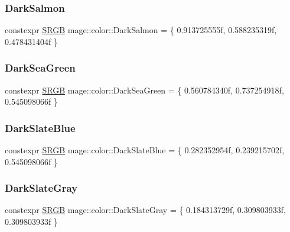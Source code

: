 \subsubsection{\texorpdfstring{Dark\+Salmon}{DarkSalmon}}
{\footnotesize\ttfamily constexpr \hyperlink{structmage_1_1_s_r_g_b}{S\+R\+GB} mage\+::color\+::\+Dark\+Salmon = \{ 0.\+913725555f, 0.\+588235319f, 0.\+478431404f \}}

\hypertarget{namespacemage_1_1color_aafa1d88a1efafbb22fb816c292546263}{}\label{namespacemage_1_1color_aafa1d88a1efafbb22fb816c292546263} 
\subsubsection{\texorpdfstring{Dark\+Sea\+Green}{DarkSeaGreen}}
{\footnotesize\ttfamily constexpr \hyperlink{structmage_1_1_s_r_g_b}{S\+R\+GB} mage\+::color\+::\+Dark\+Sea\+Green = \{ 0.\+560784340f, 0.\+737254918f, 0.\+545098066f \}}

\hypertarget{namespacemage_1_1color_a92c0b8b951c784c24337da6885e9d6ce}{}\label{namespacemage_1_1color_a92c0b8b951c784c24337da6885e9d6ce} 
\subsubsection{\texorpdfstring{Dark\+Slate\+Blue}{DarkSlateBlue}}
{\footnotesize\ttfamily constexpr \hyperlink{structmage_1_1_s_r_g_b}{S\+R\+GB} mage\+::color\+::\+Dark\+Slate\+Blue = \{ 0.\+282352954f, 0.\+239215702f, 0.\+545098066f \}}

\hypertarget{namespacemage_1_1color_a0c8f6b007621e5583c16d43c0acf4dd4}{}\label{namespacemage_1_1color_a0c8f6b007621e5583c16d43c0acf4dd4} 
\subsubsection{\texorpdfstring{Dark\+Slate\+Gray}{DarkSlateGray}}
{\footnotesize\ttfamily constexpr \hyperlink{structmage_1_1_s_r_g_b}{S\+R\+GB} mage\+::color\+::\+Dark\+Slate\+Gray = \{ 0.\+184313729f, 0.\+309803933f, 0.\+309803933f \}}

